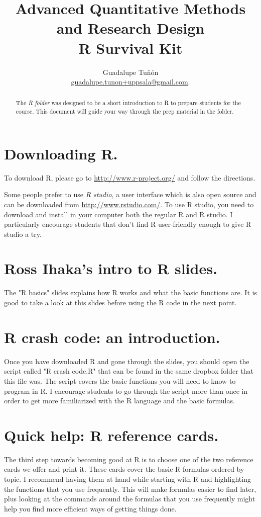 \documentclass[11pt,a4paper]{article}
\title{%
		\large 
		Advanced Quantitative Methods and Research Design\\
       R Survival Kit
		\vspace*{10pt}}
\author{%
\vspace{1pt}
	Guadalupe Tu\~n\' on \\
	\href{mailto:guadalupe.tunon+uppsala@gmail.com}{guadalupe.tunon+uppsala@gmail.com}.\\
	\vspace{11pt}
	}
\makeatletter
\def\printtitle{%
    {\color{bl} \centering \LARGE \sc \textbf{\@title}\par}}		%
\def\printauthor{%
    {\centering \small \@author}}			%
\makeatother
\begin{document}
	\vspace{15pt}
\printtitle 
\printauthor

\begin{abstract}
The \emph{R folder} was designed to be a short introduction to R to prepare students for the course. 
This document will guide your way through the prep material in the folder.  
\end{abstract}
\vspace{15pt}


\section{Downloading R.} 
To download R, please go to \href{http://www.r-project.org/}{http://www.r-project.org/} and follow the directions. 

Some people prefer to use \emph{R studio}, a user interface which is also open source and can be downloaded from \href{http://www.rstudio.com/}{http://www.rstudio.com/}. To use R studio, you need to download and install in your computer both the regular R and R studio. I particularly encourage students that don't find R user-friendly enough to give R studio a try. 

\section{Ross Ihaka's intro to R slides.}
The "R basics" slides explains how R works and what the basic functions are. It is good to take a look at this slides before using the R code in the next point. 


\section{R crash code: an introduction.}
Once you have downloaded R and gone through the slides, you should open the script called "R crash code.R" that can be found in the same dropbox folder that this file was. The script covers the basic functions you will need to know to program in R. I encourage students to go through the script more than once in order to get more familiarized with the R language and the basic formulas. 


\section{Quick help: R reference cards.}
The third step towards becoming good at R is to choose one of the two reference cards we offer and print it. These cards cover the basic R formulas ordered by topic. I recommend having them at hand while starting with R and highlighting the functions that you use frequently. This will make formulas easier to find later, plus looking at the commands around the formulas that you use frequently might help you find more efficient ways of getting things done.
\end{document}
